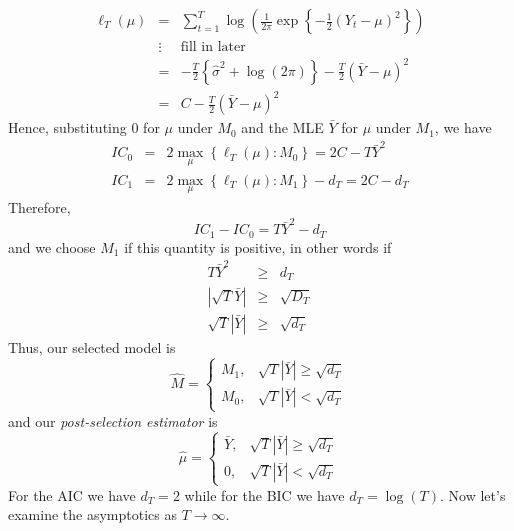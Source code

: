 \documentclass[12pt]{article}
\theoremstyle{definition}
\begin{document}
\begin{eqnarray*}
	\ell_T(\mu)&=& \sum_{t=1}^T \log \left( \frac{1}{2\pi} \exp \left\{-\frac{1}{2}(Y_t - \mu)^2 \right\}\right)\\
	&\vdots& \boxed{\mbox{fill in later}}\\
	&=& -\frac{T}{2} \left\{ \widehat{\sigma}^2 + \log(2\pi)\right\} - \frac{T}{2}\left(\bar{Y} - \mu \right)^2\\
	&=& C - \frac{T}{2}\left(\bar{Y} - \mu \right)^2
\end{eqnarray*}
Hence, substituting $0$ for $\mu$ under $M_0$ and the MLE $\bar{Y}$ for $\mu$ under $M_1$, we have
	\begin{eqnarray*}
		IC_0 &=& 2 \max_\mu \left\{\ell_T(\mu)\colon M_0 \right\} = 2C - T\bar{Y}^2\\
		IC_1 &=&2 \max_\mu \left\{\ell_T(\mu)\colon M_1 \right\} - d_T = 2C - d_T
	\end{eqnarray*}
Therefore,
	$$IC_1 - IC_0 = T\bar{Y}^2 - d_T$$
and we choose $M_1$ if this quantity is positive, in other words if
	\begin{eqnarray*}
		T\bar{Y}^2 &\geq& d_T\\
		\left|\sqrt{T} \bar{Y} \right| &\geq& \sqrt{D_T}\\
		\sqrt{T} \left|\bar{Y} \right| &\geq& \sqrt{d_T}
	\end{eqnarray*}
Thus, our selected model is 
	$$\widehat{M} = \left\{\begin{array}
		{cc} M_1, & \sqrt{T}\left|\bar{Y} \right| \geq \sqrt{d_T} \\
		M_0, & \sqrt{T}\left| \bar{Y}\right| < \sqrt{d_T}
	\end{array} \right.$$
and our \emph{post-selection estimator} is 
	$$\widehat{\mu}=\left\{\begin{array}
		{cc} \bar{Y}, & \sqrt{T}\left|\bar{Y} \right| \geq \sqrt{d_T} \\
		0, & \sqrt{T}\left| \bar{Y}\right| < \sqrt{d_T}
		\end{array}\right.$$
For the AIC we have $d_T = 2$ while for the BIC we have $d_T = \log(T)$. Now let's examine the asymptotics as $T \rightarrow \infty$.
\end{document}
